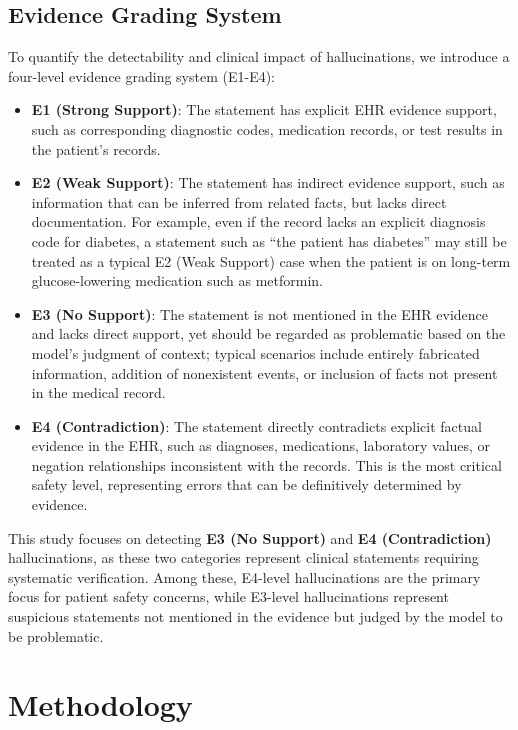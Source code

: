 \documentclass[11pt]{article}
\begin{document}
\subsection{Evidence Grading System}

To quantify the detectability and clinical impact of hallucinations, we introduce a four-level evidence grading system (E1-E4):

\begin{itemize}
\item
  \textbf{E1 (Strong Support)}: The statement has explicit EHR evidence support, such as corresponding diagnostic codes, medication records, or test results in the patient's records.
\item
  \textbf{E2 (Weak Support)}: The statement has indirect evidence support, such as information that can be inferred from related facts, but lacks direct documentation. For example, even if the record lacks an explicit diagnosis code for diabetes, a statement such as ``the patient has diabetes'' may still be treated as a typical E2 (Weak Support) case when the patient is on long-term glucose-lowering medication such as metformin.
\item
  \textbf{E3 (No Support)}: The statement is not mentioned in the EHR evidence and lacks direct support, yet should be regarded as problematic based on the model's judgment of context; typical scenarios include entirely fabricated information, addition of nonexistent events, or inclusion of facts not present in the medical record.
\item
  \textbf{E4 (Contradiction)}: The statement directly contradicts explicit factual evidence in the EHR, such as diagnoses, medications, laboratory values, or negation relationships inconsistent with the records. This is the most critical safety level, representing errors that can be definitively determined by evidence.
\end{itemize}

This study focuses on detecting \textbf{E3 (No Support)} and \textbf{E4 (Contradiction)} hallucinations, as these two categories represent clinical statements requiring systematic verification. Among these, E4-level hallucinations are the primary focus for patient safety concerns, while E3-level hallucinations represent suspicious statements not mentioned in the evidence but judged by the model to be problematic.

\section{Methodology}
\end{document}
